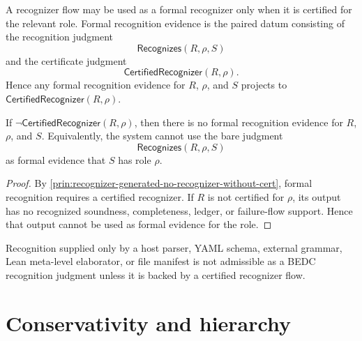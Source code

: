 \begin{principle}
\label{prin:recognizer-generated-no-recognizer-without-cert}
A recognizer flow may be used as a formal recognizer only when it is certified for the relevant role. Formal recognition evidence is the paired datum consisting of the recognition judgment
$$
  \mathsf{Recognizes}(R,\rho,S)
$$
and the certificate judgment
$$
  \mathsf{CertifiedRecognizer}(R,\rho).
$$
Hence any formal recognition evidence for $R$, $\rho$, and $S$ projects to $\mathsf{CertifiedRecognizer}(R,\rho)$.
\end{principle}

\begin{theorem}
\label{thm:recognizer-generated-uncertified-cannot-license}
If $\neg\mathsf{CertifiedRecognizer}(R,\rho)$, then there is no formal recognition evidence for $R$, $\rho$, and $S$. Equivalently, the system cannot use the bare judgment
$$
  \mathsf{Recognizes}(R,\rho,S)
$$
as formal evidence that $S$ has role $\rho$.
\end{theorem}

\begin{proof}
By \autoref{prin:recognizer-generated-no-recognizer-without-cert}, formal recognition requires a certified recognizer. If $R$ is not certified for $\rho$, its output has no recognized soundness, completeness, ledger, or failure-flow support. Hence that output cannot be used as formal evidence for the role.
\end{proof}

\begin{corollary}
\label{cor:recognizer-generated-host-parser-inadmissible}
Recognition supplied only by a host parser, YAML schema, external grammar, Lean meta-level elaborator, or file manifest is not admissible as a BEDC recognition judgment unless it is backed by a certified recognizer flow.
\end{corollary}

\section{Conservativity and hierarchy}
\label{sec:recognizer-generated-conservativity-hierarchy}

